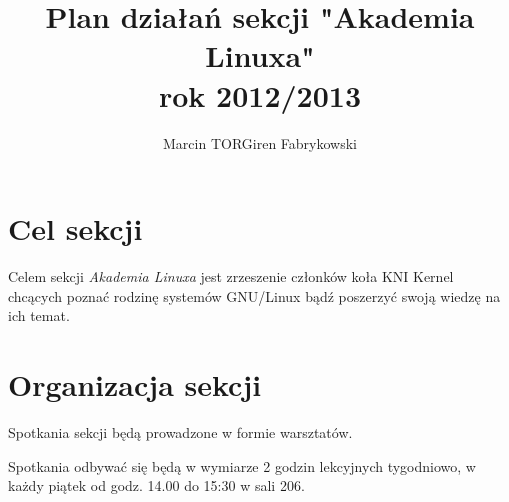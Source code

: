 \documentclass[a4paper,12pt]{article}
\title{Plan działań sekcji "Akademia Linuxa"\\rok 2012/2013}
\author{Marcin TORGiren Fabrykowski}
\begin{document}
\maketitle
\newpage
\section{Cel sekcji}
Celem sekcji \textit{Akademia Linuxa} jest zrzeszenie członków koła KNI Kernel chcących poznać rodzinę systemów GNU/Linux bądź poszerzyć swoją wiedzę na ich temat.
\section{Organizacja sekcji}
Spotkania sekcji będą prowadzone w formie warsztatów.

Spotkania odbywać się będą w wymiarze 2 godzin lekcyjnych tygodniowo, w każdy piątek od godz. 14.00 do 15:30 w sali 206.
\end{document}
